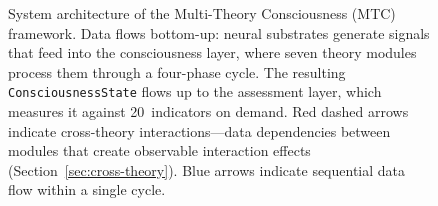 \begin{figure}[t]
\begin{tikzpicture}
\end{tikzpicture}

\caption{System architecture of the Multi-Theory Consciousness (MTC) framework.
Data flows bottom-up: neural substrates generate signals that feed into the
consciousness layer, where seven theory modules process them through a four-phase
cycle. The resulting \texttt{ConsciousnessState} flows up to the assessment layer,
which measures it against 20~indicators on demand. Red dashed arrows indicate
cross-theory interactions---data dependencies between modules that create observable
interaction effects (Section~\ref{sec:cross-theory}). Blue arrows indicate sequential
data flow within a single cycle.}
\label{fig:architecture}
\end{figure}
